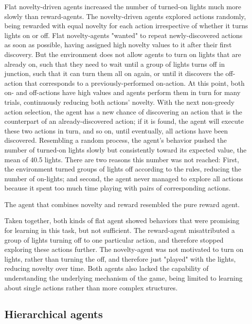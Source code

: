 \documentclass{article}
\begin{document}
Flat novelty-driven agents increased the number of turned-on lights much more slowly than reward-agents. The novelty-driven agents explored actions randomly, being rewarded with equal novelty for each action irrespective of whether it turns lights on or off. Flat novelty-agents "wanted" to repeat newly-discovered actions as soon as possible, having assigned high novelty values to it after their first discovery. But the environment does not allow agents to turn on lights that are already on, such that they need to wait until a group of lights turns off in junction, such that it can turn them all on again, or until it discovers the off-action that corresponds to a previously-performed on-action. At this point, both on- and off-actions have high values and agents perform them in turn for many trials, continuously reducing both actions' novelty. With the next non-greedy action selection, the agent has a new chance of discovering an action that is the counterpart of an already-discovered action; if it is found, the agent will execute these two actions in turn, and so on, until eventually, all actions have been discovered. Resembling a random process, the agent's behavior pushed the number of turned-on lights slowly but consistently toward its expected value, the mean of 40.5 lights. There are two reasons this number was not reached: First, the environment turned groups of lights off according to the rules, reducing the number of on-lights; and second, the agent never managed to explore all actions because it spent too much time playing with pairs of corresponding actions. 

The agent that combines novelty and reward resembled the pure reward agent. 

Taken together, both kinds of flat agent showed behaviors that were promising for learning in this task, but not sufficient. The reward-agent misattributed a group of lights turning off to one particular action, and therefore stopped exploring these actions further. The novelty-agent was not motivated to turn on lights, rather than turning the off, and therefore just "played" with the lights, reducing novelty over time. Both agents also lacked the capability of understanding the underlying mechanism of the game, being limited to learning about single actions rather than more complex structures. 


\subsection{Hierarchical agents}
\end{document}
